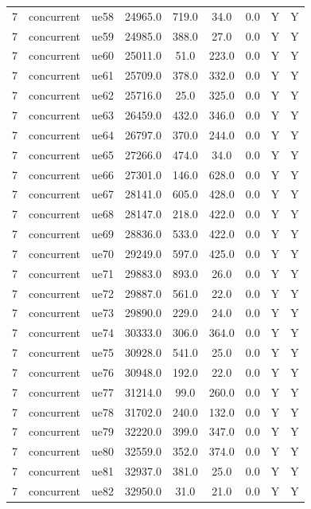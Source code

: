 \begin{table}[ht]
\begin{tabular}{|c|c|c|c|c|c|c|c|c|}
7 & concurrent & ue58 & 24965.0 & 719.0 & 34.0 & 0.0 & Y & Y \\
7 & concurrent & ue59 & 24985.0 & 388.0 & 27.0 & 0.0 & Y & Y \\
7 & concurrent & ue60 & 25011.0 & 51.0 & 223.0 & 0.0 & Y & Y \\
7 & concurrent & ue61 & 25709.0 & 378.0 & 332.0 & 0.0 & Y & Y \\
7 & concurrent & ue62 & 25716.0 & 25.0 & 325.0 & 0.0 & Y & Y \\
7 & concurrent & ue63 & 26459.0 & 432.0 & 346.0 & 0.0 & Y & Y \\
7 & concurrent & ue64 & 26797.0 & 370.0 & 244.0 & 0.0 & Y & Y \\
7 & concurrent & ue65 & 27266.0 & 474.0 & 34.0 & 0.0 & Y & Y \\
7 & concurrent & ue66 & 27301.0 & 146.0 & 628.0 & 0.0 & Y & Y \\
7 & concurrent & ue67 & 28141.0 & 605.0 & 428.0 & 0.0 & Y & Y \\
7 & concurrent & ue68 & 28147.0 & 218.0 & 422.0 & 0.0 & Y & Y \\
7 & concurrent & ue69 & 28836.0 & 533.0 & 422.0 & 0.0 & Y & Y \\
7 & concurrent & ue70 & 29249.0 & 597.0 & 425.0 & 0.0 & Y & Y \\
7 & concurrent & ue71 & 29883.0 & 893.0 & 26.0 & 0.0 & Y & Y \\
7 & concurrent & ue72 & 29887.0 & 561.0 & 22.0 & 0.0 & Y & Y \\
7 & concurrent & ue73 & 29890.0 & 229.0 & 24.0 & 0.0 & Y & Y \\
7 & concurrent & ue74 & 30333.0 & 306.0 & 364.0 & 0.0 & Y & Y \\
7 & concurrent & ue75 & 30928.0 & 541.0 & 25.0 & 0.0 & Y & Y \\
7 & concurrent & ue76 & 30948.0 & 192.0 & 22.0 & 0.0 & Y & Y \\
7 & concurrent & ue77 & 31214.0 & 99.0 & 260.0 & 0.0 & Y & Y \\
7 & concurrent & ue78 & 31702.0 & 240.0 & 132.0 & 0.0 & Y & Y \\
7 & concurrent & ue79 & 32220.0 & 399.0 & 347.0 & 0.0 & Y & Y \\
7 & concurrent & ue80 & 32559.0 & 352.0 & 374.0 & 0.0 & Y & Y \\
7 & concurrent & ue81 & 32937.0 & 381.0 & 25.0 & 0.0 & Y & Y \\
7 & concurrent & ue82 & 32950.0 & 31.0 & 21.0 & 0.0 & Y & Y \\

\end{tabular}
\end{table}
